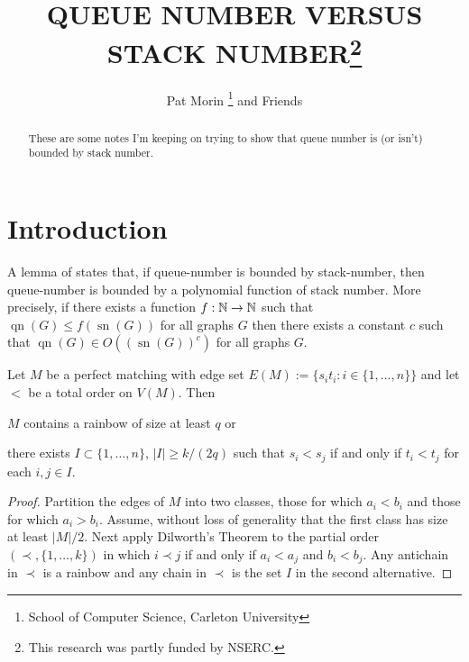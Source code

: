 \documentclass{patmorin}
\title{\MakeUppercase{Queue Number versus Stack Number}\thanks{This research was partly funded by NSERC.}}
\author{Pat Morin%
    \thanks{School of Computer Science, Carleton University}\quad
    and Friends}
\date{}
\DeclareMathOperator{\qn}{qn}
\DeclareMathOperator{\sn}{sn}
\begin{document}
\maketitle

\begin{abstract}
    These are some notes I'm keeping on trying to show that queue number is (or isn't) bounded by stack number.
\end{abstract}

%



\section{Introduction}

A lemma of \citet{dujmovic.wood:stacks} states that, if queue-number is bounded by stack-number, then queue-number is bounded by a polynomial function of stack number. More precisely, if there exists a function $f:\mathbb{N}\to\mathbb{N}$ such that $\qn(G)\le f(\sn(G))$ for all graphs $G$ then there exists a constant $c$ such that $\qn(G)\in O((\sn(G))^c)$ for all graphs $G$.

\begin{lem}\label{rainbow_alternative}
    Let $M$ be a perfect matching with edge set $E(M):=\{s_it_i:i\in\{1,\ldots,n\}\}$ and let $<$ be a total order on $V(M)$.  Then
    \begin{compactenum}[(i)]
        \item $M$ contains a rainbow of size at least $q$ or
        \item there exists $I\subset\{1,\ldots,n\}$, $|I|\ge k/(2q)$ such that $s_i < s_j$ if and only if $t_i< t_j$ for each $i,j\in I$.
    \end{compactenum}
\end{lem}

\begin{proof}
    Partition the edges of $M$ into two classes, those for which $a_i<b_i$ and those for which $a_i>b_i$.  Assume, without loss of generality that the first class has size at least $|M|/2$.  Next apply Dilworth's Theorem to the partial order $(\prec,\{1,\ldots,k\})$ in which $i\prec j$ if and only if $a_i<a_j$ and $b_i < b_j$.  Any antichain in $\prec$ is a rainbow and any chain in $\prec$ is the set $I$ in the second alternative.
\end{proof}
\end{document}
